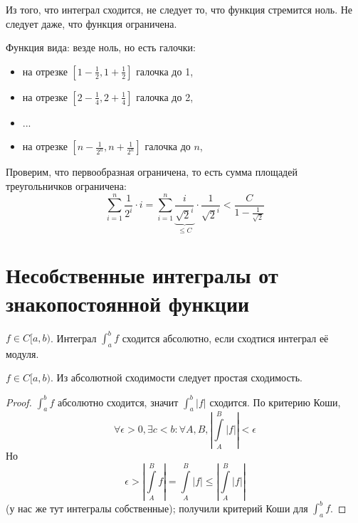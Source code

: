\begin{Rem}
	Из того, что интеграл сходится, не следует то, что функция стремится ноль.
	Не следует даже, что функция ограничена.
\end{Rem}
\begin{exmp}
	Функция вида: везде ноль, но есть галочки:
	\begin{itemize}
		\item на отрезке $\left[1 - \frac12, 1 + \frac12\right]$ галочка до 1,
		\item на отрезке $\left[2 - \frac14, 2 + \frac14\right]$ галочка до 2,
		\item ...
		\item на отрезке $\left[n - \frac1{2^n}, n + \frac1{2^n}\right]$ галочка до $n$,
	\end{itemize}
	Проверим, что первообразная ограничена, то есть сумма площадей треугольничков ограничена:
	\[
		\sum_{i=1}^n \frac1{2^i} \cdot i
		= \sum_{i=1}^n \underbrace{\frac i{\sqrt{2}^i}}_{\le C} \cdot \frac1{\sqrt{2}^i}
		< \frac{C}{1-\frac1{\sqrt 2}}
	\]
\end{exmp}

\section{Несобственные интегралы от знакопостоянной функции}

\begin{Def}
	$f \in C[a, b)$.
	Интеграл $\int_a^b f$ сходится абсолютно, если сходтися интеграл её модуля.
\end{Def}

\begin{theorem}
	$f \in C[a, b)$.
	Из абсолютной сходимости следует простая сходимость.
\end{theorem}
\begin{proof}
	$\int_a^b f$ абсолютно сходится, значит $\int_a^b |f|$ сходится.
	По критерию Коши,
	\[ \forall \epsilon > 0, \exists c < b\colon \forall A, B, \left|\int\limits_A^B |f|\right| < \epsilon \]
	Но
	\[ \epsilon > \left|\int\limits_A^B f\right| = \int\limits_A^B |f| \le \left| \int\limits_A^B |f| \right|\]
	(у нас же тут интегралы собственные);
	получили критерий Коши для $\int_a^b f$.
\end{proof}
